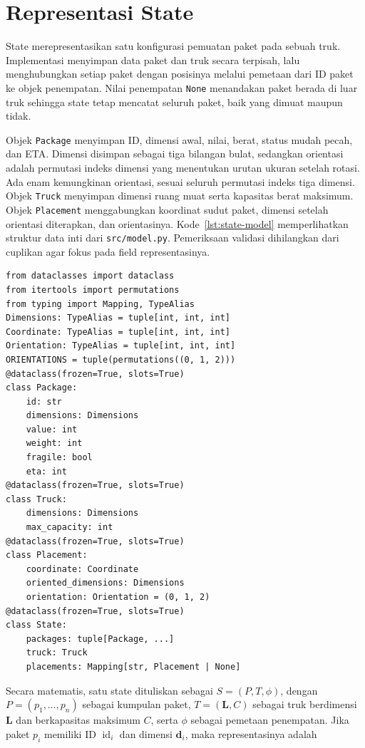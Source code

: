 \section{Representasi State}

State merepresentasikan satu konfigurasi pemuatan paket pada sebuah truk. Implementasi menyimpan data paket dan truk secara terpisah, lalu menghubungkan setiap paket dengan posisinya melalui pemetaan dari ID paket ke objek penempatan. Nilai penempatan \texttt{None} menandakan paket berada di luar truk sehingga state tetap mencatat seluruh paket, baik yang dimuat maupun tidak.

Objek \texttt{Package} menyimpan ID, dimensi awal, nilai, berat, status mudah pecah, dan ETA. Dimensi disimpan sebagai tiga bilangan bulat, sedangkan orientasi adalah permutasi indeks dimensi yang menentukan urutan ukuran setelah rotasi. Ada enam kemungkinan orientasi, sesuai seluruh permutasi indeks tiga dimensi. Objek \texttt{Truck} menyimpan dimensi ruang muat serta kapasitas berat maksimum. Objek \texttt{Placement} menggabungkan koordinat sudut paket, dimensi setelah orientasi diterapkan, dan orientasinya. Kode~\ref{lst:state-model} memperlihatkan struktur data inti dari \texttt{src/model.py}. Pemeriksaan validasi dihilangkan dari cuplikan agar fokus pada field representasinya.

\begin{samepage}
    \begin{lstlisting}[caption={Struktur inti model state},label={lst:state-model}]
from dataclasses import dataclass
from itertools import permutations
from typing import Mapping, TypeAlias
Dimensions: TypeAlias = tuple[int, int, int]
Coordinate: TypeAlias = tuple[int, int, int]
Orientation: TypeAlias = tuple[int, int, int]
ORIENTATIONS = tuple(permutations((0, 1, 2)))
@dataclass(frozen=True, slots=True)
class Package:
    id: str
    dimensions: Dimensions
    value: int
    weight: int
    fragile: bool
    eta: int
@dataclass(frozen=True, slots=True)
class Truck:
    dimensions: Dimensions
    max_capacity: int
@dataclass(frozen=True, slots=True)
class Placement:
    coordinate: Coordinate
    oriented_dimensions: Dimensions
    orientation: Orientation = (0, 1, 2)
@dataclass(frozen=True, slots=True)
class State:
    packages: tuple[Package, ...]
    truck: Truck
    placements: Mapping[str, Placement | None]
\end{lstlisting}
\end{samepage}

Secara matematis, satu state dituliskan sebagai $S=(P,T,\phi)$, dengan $P=(p_1,\ldots,p_n)$ sebagai kumpulan paket, $T=(\mathbf{L},C)$ sebagai truk berdimensi $\mathbf{L}$ dan berkapasitas maksimum $C$, serta $\phi$ sebagai pemetaan penempatan. Jika paket $p_i$ memiliki ID $\operatorname{id}_i$ dan dimensi $\mathbf{d}_i$, maka representasinya adalah


